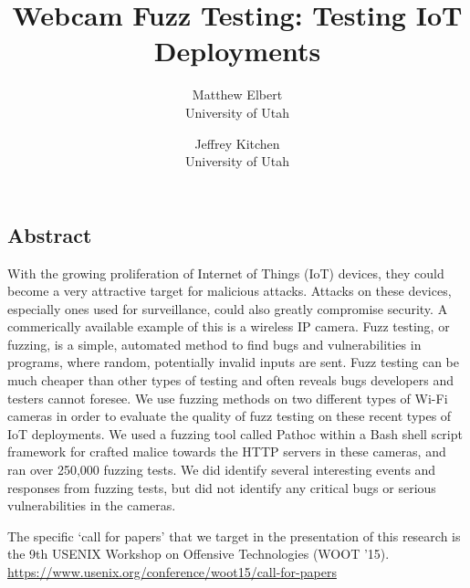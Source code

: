 \documentclass[letterpaper,twocolumn,10pt]{article}
\begin{document}
\date{}

\title{\Large \bf Webcam Fuzz Testing: Testing IoT Deployments}

\author{
{\rm Matthew Elbert}\\
University of Utah
\and
{\rm Jeffrey Kitchen}\\
University of Utah
} %

\maketitle

\thispagestyle{empty}


\subsection*{Abstract}

With the growing proliferation of Internet of Things (IoT) devices, they could become a very attractive target for malicious attacks. Attacks on these devices, especially ones used for surveillance, could also greatly compromise security. A commerically available example of this is a wireless IP camera.
Fuzz testing, or fuzzing, is a simple, automated method to find bugs and vulnerabilities in programs, where random, potentially invalid inputs are sent. Fuzz testing can be much cheaper than other types of testing and often reveals bugs developers and testers cannot foresee. We use fuzzing methods on two different types of Wi-Fi cameras in order to evaluate the quality of fuzz testing on these recent types of IoT deployments. We used a fuzzing tool called Pathoc within a Bash shell script framework for crafted malice towards the HTTP servers in these cameras, and ran over 250,000 fuzzing tests. We did identify several interesting events and responses from fuzzing tests, but did not identify any critical bugs or serious vulnerabilities in the cameras. 



The specific `call for papers' that we target in the presentation of this research is the 9th USENIX Workshop on Offensive Technologies (WOOT '15). \url{https://www.usenix.org/conference/woot15/call-for-papers}
\end{document}
